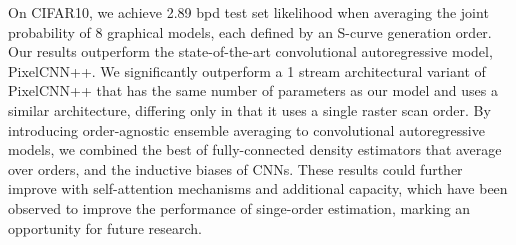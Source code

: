 \documentclass[letterpaper]{article}
\begin{document}
\begin{table}
\caption{Average conditional negative log likelihood for \textbf{T}op, \textbf{L}eft and \textbf{B}ottom half image completion.}
\vspace{-2mm}
\label{table:mnistbpd}
\begin{center}
\end{center}
\vspace{-4mm}
\end{table}
 
On CIFAR10, we achieve 2.89 bpd test set likelihood when averaging the joint probability of 8 graphical models, each defined by an S-curve generation order. Our results outperform the state-of-the-art convolutional autoregressive model, PixelCNN++. We significantly outperform a 1 stream architectural variant of PixelCNN++ that has the same number of parameters as our model and uses a similar architecture, differing only in that it uses a single raster scan order. By introducing order-agnostic ensemble averaging to convolutional autoregressive models, we combined the best of fully-connected density estimators that average over orders, and the inductive biases of CNNs. These results could further improve with self-attention mechanisms and additional capacity, which have been observed to improve the performance of singe-order estimation, marking an opportunity for future research.
\end{document}
